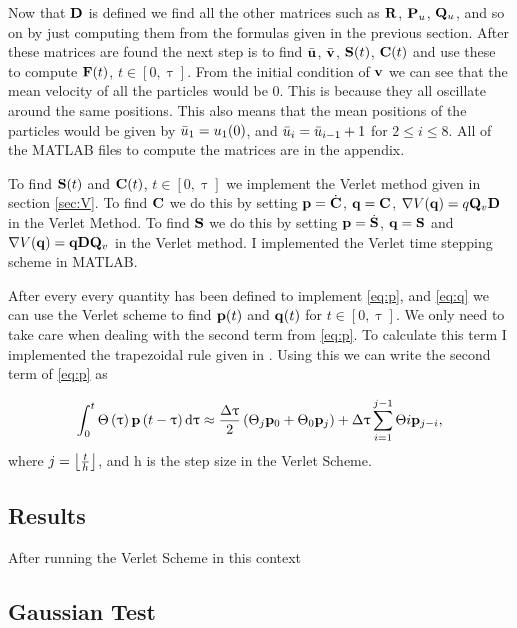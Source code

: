 Now that $\mathbf{D}$ is defined we find all the other matrices such as $\mathbf{R}$, $\mathbf{P}_u$, $\mathbf{Q}_u$, and so on by just computing them from the formulas given in the previous section. After these matrices are found the next step is to find $\bar{\mathbf{u}}$, $\bar{\mathbf{v}}$, $\mathbf{S}(t)$, $\mathbf{C}(t)$ and use these to compute $\mathbf{F}(t)$, $t\in\left[0, \uptau \right]$. From the initial condition of $\mathbf{v}$ we can see that the mean velocity of all the particles would be 0. This is  because they all oscillate around the same positions. This also means that the mean positions of the particles would be given by $\bar{u}_1 = u_1(0)$, and $\bar{u}_i=\bar{u}_{i-1}+1$ for $2\leq i\leq 8$. All of the MATLAB files to compute the matrices are in the appendix. 

To find $\mathbf{S}(t)$ and $\mathbf{C}(t)$, $t\in \left[0,\uptau\right]$ we implement the Verlet method given in section \ref{sec:V}. To find $\mathbf{C}$ we do this by setting $\mathbf{p} = \dot{\mathbf{C}}$, $\mathbf{q} = \mathbf{C}$, $\nabla V(\mathbf{q})=q\mathbf{Q}_v \mathbf{D}$ in the Verlet Method. To find $\mathbf{S}$ we do this by setting $\mathbf{p}=\dot{\mathbf{S}}$, $\mathbf{q}=\mathbf{S}$ and $\nabla V(\mathbf{q})=\mathbf{q}\mathbf{D}\mathbf{Q}_v$ in the Verlet method. I implemented the Verlet time stepping scheme in MATLAB.

After every every quantity has been defined to implement \eqref{eq:p}, and \eqref{eq:q} we can use the Verlet scheme to find $\mathbf{p}(t)$ and $\mathbf{q}(t)$ for $t\in\left[0,\uptau \right]$. We only need to take care when dealing with the second term from \eqref{eq:p}. To calculate this term I implemented the trapezoidal rule given in \cite{Scherer2015}. Using this we can write the second term of \eqref{eq:p} as

\begin{align*}
\int_{0}^{t} \Theta\left(\uptau\right)\mathbf{p}\left(t-\uptau\right) \mathop{}\!\mathrm{d} \uptau \approx \frac{\Delta \uptau}{2}\left(\Theta_j\mathbf{p}_{0}+\Theta_0\mathbf{p}_{j}\right) + \Delta\uptau\sum_{i=1}^{j-1} \Theta{i}\mathbf{p}_{j-i}, 
\end{align*}
where $j=\left \lfloor \frac{t}{h} \right \rfloor$, and h is the step size in the Verlet Scheme.

\subsection{Results}

After running the Verlet Scheme in this context 

\subsection{Gaussian Test}

